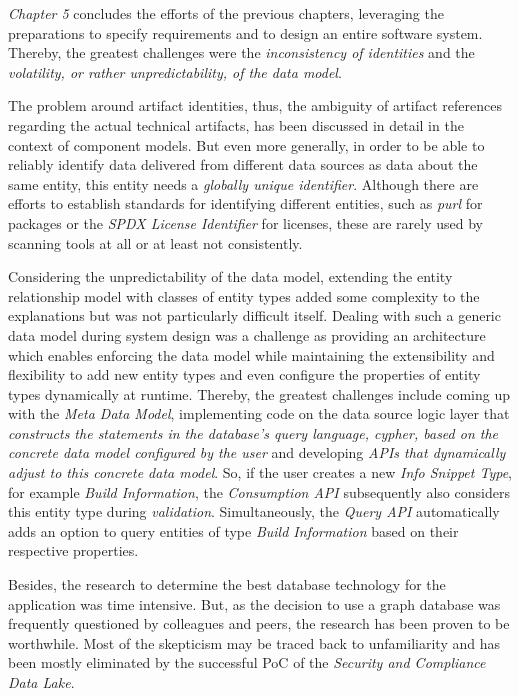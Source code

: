 \emph{Chapter 5} concludes the efforts of the previous chapters, leveraging the preparations to specify requirements and to design an entire software system. Thereby, the greatest challenges were the \emph{inconsistency of identities} and the \emph{volatility, or rather unpredictability, of the data model}.\par
The problem around artifact identities, thus, the ambiguity of artifact references regarding the actual technical artifacts, has been discussed in detail in the context of component models. But even more generally, in order to be able to reliably identify data delivered from different data sources as data about the same entity, this entity needs a \emph{globally unique identifier}. Although there are efforts to establish standards for identifying different entities, such as \emph{purl} for packages or the \emph{SPDX License Identifier} for licenses, these are rarely used by scanning tools at all or at least not consistently.\par
Considering the unpredictability of the data model, extending the entity relationship model with classes of entity types added some complexity to the explanations but was not particularly difficult itself. Dealing with such a generic data model during system design was a challenge as providing an architecture which enables enforcing the data model while maintaining the extensibility and flexibility to add new entity types and even configure the properties of entity types dynamically at runtime. Thereby, the greatest challenges include coming up with the \emph{Meta Data Model}, implementing code on the data source logic layer that \emph{constructs the statements in the database's query language, cypher, based on the concrete data model configured by the user} and developing \emph{APIs that dynamically adjust to this concrete data model}. So, if the user creates a new \emph{Info Snippet Type}, for example \emph{Build Information}, the \emph{Consumption API} subsequently also considers this entity type during \emph{validation}. Simultaneously, the \emph{Query API} automatically adds an option to query entities of type \emph{Build Information} based on their respective properties.\par
Besides, the research to determine the best database technology for the application was time intensive. But, as the decision to use a graph database was frequently questioned by colleagues and peers, the research has been proven to be worthwhile. Most of the skepticism may be traced back to unfamiliarity and has been mostly eliminated by the successful PoC of the \emph{Security and Compliance Data Lake}.\\


